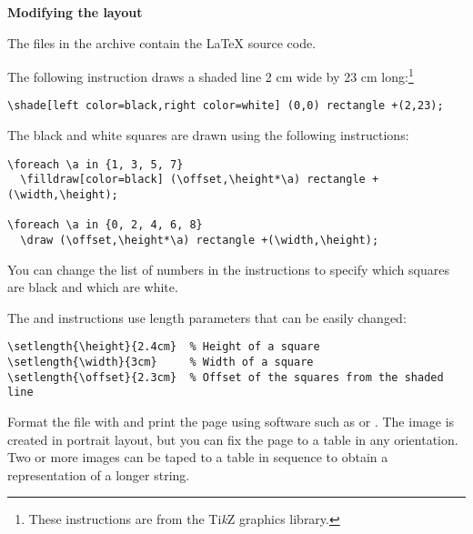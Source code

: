 \bigskip

\textbf{Modifying the layout}


The files  in the archive contain the
\LaTeX{} source code.

The following instruction draws a shaded line 2 cm wide by 23 cm
long:\footnote{These instructions are from the Ti\textit{k}Z
graphics library.}
\begin{footnotesize}
\begin{verbatim}
\shade[left color=black,right color=white] (0,0) rectangle +(2,23);
\end{verbatim}
\end{footnotesize}

The black and white squares are drawn using the following instructions: 
\begin{footnotesize}
\begin{verbatim}
\foreach \a in {1, 3, 5, 7}
  \filldraw[color=black] (\offset,\height*\a) rectangle +(\width,\height);

\foreach \a in {0, 2, 4, 6, 8}
  \draw (\offset,\height*\a) rectangle +(\width,\height);
\end{verbatim}
\end{footnotesize}
You can change the list of numbers in the  instructions
to specify which squares are black and which are white.

The  and  instructions use length parameters that
can be easily changed:
\begin{footnotesize}
\begin{verbatim}
\setlength{\height}{2.4cm}  % Height of a square
\setlength{\width}{3cm}     % Width of a square
\setlength{\offset}{2.3cm}  % Offset of the squares from the shaded line
\end{verbatim}
\end{footnotesize}

Format the file with  and print the page using software
such as  or . The image is created in
portrait layout, but you can fix the page to a table in any orientation.
Two or more images can be taped to a table in sequence to obtain a
representation of a longer string.
